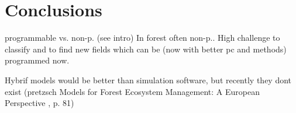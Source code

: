 \chapter{Conclusions}
\label{chap:discussion}
programmable vs. non-p. (see intro) In forest often non-p.. High challenge to classify and to find new fields which can be (now with better pc and methods) programmed now.

Hybrif models would be better than simulation software, but recently they dont exist (pretzsch Models for Forest Ecosystem Management: A European Perspective
, p. 81)